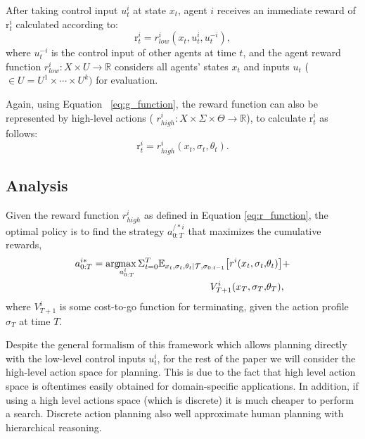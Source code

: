 \documentclass[letterpaper, 10 pt, conference]{ieeeconf}  %
\newcommand{\argmax}{\arg\!\!\max}
\begin{document}
After taking control input $u_t^i$ at state $x_t$, agent $i$ receives an immediate reward of r$^i_t$ calculated according to: 
\begin{equation}\label{eq:r_control_input}
  \text{r}^i_t = r^i_{low}(x_t,u^i_t,u^{-i}_t),
\end{equation}
where $u^{-i}_t$ is the control input of other agents at time $t$, and the agent reward function $r^i_{low}: X \times U \rightarrow \mathbb{R}$ considers 
all agents' states $x_t$ and inputs $u_t$ ($\in U = U^1\times \cdots \times U^k)$ 
for evaluation. 

Again, using Equation ~\ref{eq:g_function}, the reward function can also be 
represented by high-level actions (
$r^i_{high}:X\times \Sigma \times \Theta \rightarrow \mathbb{R}$), to 
calculate r$^i_t$ as follows:
\begin{equation}\label{eq:r_function}
\text{r}^i_t = r^i_{high}(x_t,\sigma_t,\theta_t).
\end{equation}

\subsection{Analysis}
Given the reward function $r^i_{high}$ as defined in Equation \ref{eq:r_function}, the optimal policy is to find the strategy $a^{/*i}_{0:T}$ that maximizes the cumulative rewards,
\begin{equation}\label{eq:optimal}
\begin{aligned}
  a^{i*}_{0:T} = \argmax_{a^i_{0:T}} 
  \Sigma_{t=0}^{T} 
  \mathbb{E}_{x_t,\sigma_{t},\theta_t|\mathcal{T},\sigma_{0:t-1}} \big{[}
  r^i(x_t,\sigma_t,&\theta_t)\big{]}+ \\ 
  V^i_{T+1}(x_T,\sigma_T,&\theta_T), 
\end{aligned}
\end{equation}
where $V^i_{T+1}$ is some cost-to-go function for terminating, given the action profile $\sigma_T$ at time $T$.

Despite the general formalism of this framework which allows planning directly 
with the low-level control inputs $u^i_t$, 
for the rest of the paper we will consider the high-level action space for planning. This is due to the fact that high level action space is oftentimes easily obtained for domain-specific applications. In addition, if using a high level actions space (which is discrete) it is much cheaper to perform a search. Discrete action planning also well approximate human planning with hierarchical reasoning.  
\end{document}
